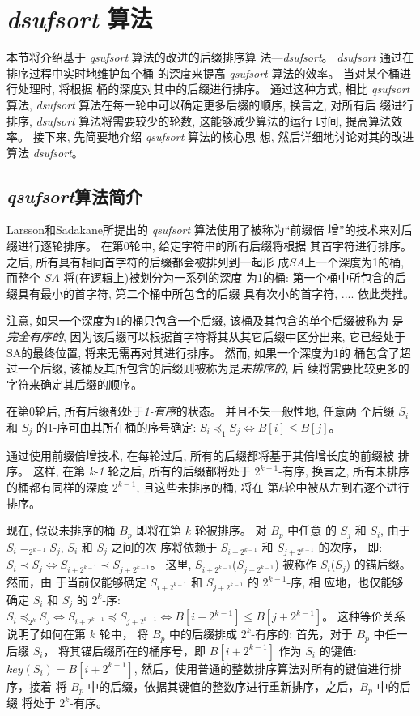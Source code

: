 \section{ \emph{dsufsort} 算法}

本节将介绍基于 \emph{qsufsort} 算法的改进的后缀排序算
法---\emph{dsufsort}。 \emph{dsufsort} 通过在排序过程中实时地维护每个桶
的深度来提高 \emph{qsufsort} 算法的效率。 当对某个桶进行处理时, 将根据
桶的深度对其中的后缀进行排序。 通过这种方式, 相比 \emph{qsufsort} 算法,
\emph{dsufsort} 算法在每一轮中可以确定更多后缀的顺序, 换言之, 对所有后
缀进行排序, \emph{dsufsort} 算法将需要较少的轮数, 这能够减少算法的运行
时间, 提高算法效率。 接下来, 先简要地介绍 \emph{qsufsort} 算法的核心思
想, 然后详细地讨论对其的改进算法 \emph{dsufsort}。

\subsection{ \emph{qsufsort}算法简介}
\label{sec:qsufsort}

Larsson和Sadakane所提出的 \emph{qsufsort} 算法使用了被称为“前缀倍
增”的技术来对后缀进行逐轮排序。 在第0轮中, 给定字符串的所有后缀将根据
其首字符进行排序。 之后, 所有具有相同首字符的后缀都会被排列到一起形
成$SA$上一个深度为1的桶, 而整个 $SA$ 将(在逻辑上)被划分为一系列的深度
为1的桶: 第一个桶中所包含的后缀具有最小的首字符, 第二个桶中所包含的后缀
具有次小的首字符, .... 依此类推。

注意, 如果一个深度为1的桶只包含一个后缀, 该桶及其包含的单个后缀被称为
是\emph{完全有序的}, 因为该后缀可以根据首字符将其从其它后缀中区分出来,
它已经处于SA的最终位置, 将来无需再对其进行排序。 然而, 如果一个深度为1的
桶包含了超过一个后缀, 该桶及其所包含的后缀则被称为是\emph{未排序的}, 后
续将需要比较更多的字符来确定其后缀的顺序。

在第0轮后, 所有后缀都处于\emph{1-有序}的状态。 并且不失一般性地, 任意两
个后缀 $S_i$ 和 $S_j$ 的1-序可由其所在桶的序号确定:
$S_i \preceq_1 S_j \iff B[i] \leq B[j]$。

通过使用前缀倍增技术, 在每轮过后, 所有的后缀都将基于其倍增长度的前缀被
排序。 这样, 在第 \emph{k-1} 轮之后, 所有的后缀都将处于 $2^{k-1}$-有序,
换言之, 所有未排序的桶都有同样的深度 $2^{k-1}$, 且这些未排序的桶, 将在
第$k$轮中被从左到右逐个进行排序。

现在, 假设未排序的桶 $B_p$ 即将在第 $k$ 轮被排序。 对 $B_p$ 中任意
的 $S_j$ 和 $S_i$, 由于 $S_i =_{2^{k-1}} S_j$, $S_i$ 和 $S_j$ 之间的次
序将依赖于 $S_{i+2^{k-1}}$ 和 $S_{j+2^{k-1}}$ 的次序， 即:
$S_i \prec S_j \iff S_{i+2^{k-1}} \prec S_{j+2^{k-1}}$。 这里,
$S_{i+2^{k-1}}$($S_{j+2^{k-1}}$) 被称作 $S_i$($S_j$) 的锚后缀。 然而，由
于当前仅能够确定 $S_{i+2^{k-1}}$ 和 $S_{j+2^{k-1}}$ 的 $2^{k-1}$-序, 相
应地，也仅能够确定 $S_i$ 和 $S_j$ 的 $2^k$-序:
$S_i \preceq_{2^k} S_j \iff S_{i+2^{k-1}} \preceq S_{j+2^{k-1}} \iff
B[i+2^{k-1}] \leq B[j+2^{k-1}]$。  这种等价关系说明了如何在第 $k$ 轮中，
将 $B_p$ 中的后缀排成 $2^k$-有序的: 首先，对于 $B_p$ 中任一后缀 $S_i$，
将其锚后缀所在的桶序号，即 $B[i+2^{k-1}]$ 作为 $S_i$ 的键值: $key(S_i)
= B[i+2^{k-1}]$, 然后，使用普通的整数排序算法对所有的键值进行排序，接着
将 $B_p$ 中的后缀，依据其键值的整数序进行重新排序，之后，$B_p$ 中的后缀
将处于 $2^k$-有序。

